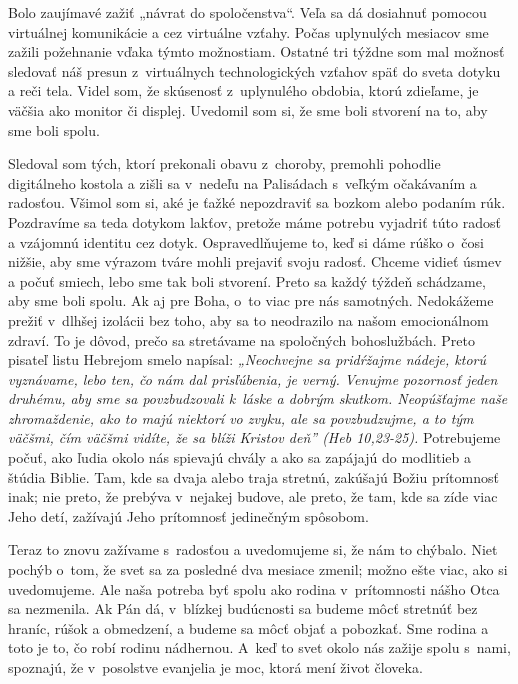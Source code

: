 


Bolo zaujímavé zažiť „návrat do spoločenstva“. Veľa sa dá dosiahnuť pomocou virtuálnej komunikácie a cez virtuálne vzťahy. Počas uplynulých mesiacov sme zažili požehnanie vďaka týmto možnostiam. Ostatné tri týždne som mal možnosť sledovať náš presun z~virtuálnych technologických vzťahov späť do sveta dotyku a reči tela. Videl som, že skúsenosť z~uplynulého obdobia, ktorú zdieľame, je väčšia ako monitor či displej. Uvedomil som si, že sme boli stvorení na to, aby sme boli spolu.

Sledoval som tých, ktorí prekonali obavu z~choroby, premohli pohodlie digitálneho kostola a zišli sa v~nedeľu na Palisádach s~veľkým očakávaním a radosťou. Všimol som si, aké je ťažké nepozdraviť sa bozkom alebo podaním rúk. Pozdravíme sa teda dotykom lakťov, pretože máme potrebu vyjadriť túto radosť a vzájomnú identitu cez dotyk. Ospravedlňujeme to, keď si dáme rúško o~čosi nižšie, aby sme výrazom tváre mohli prejaviť svoju radosť. Chceme vidieť úsmev a počuť smiech, lebo sme tak boli stvorení. Preto sa každý týždeň schádzame, aby sme boli spolu. Ak aj pre Boha, o~to viac pre nás samotných. Nedokážeme prežiť v~dlhšej izolácii bez toho, aby sa to neodrazilo na našom emocionálnom zdraví. To je dôvod, prečo sa stretávame na spoločných bohoslužbách. Preto pisateľ listu Hebrejom smelo napísal: {\it „Neochvejne sa pridŕžajme nádeje, ktorú vyznávame, lebo ten, čo nám dal prisľúbenia, je verný. Venujme pozornosť jeden druhému, aby sme sa povzbudzovali k~láske a dobrým skutkom.  Neopúšťajme naše zhromaždenie, ako to majú niektorí vo zvyku, ale sa povzbudzujme, a to tým väčšmi, čím väčšmi vidíte, že sa blíži Kristov deň” (Heb 10,23-25).} Potrebujeme počuť, ako ľudia okolo nás spievajú chvály a ako sa zapájajú do modlitieb a štúdia Biblie. Tam, kde sa dvaja alebo traja stretnú, zakúšajú Božiu prítomnosť inak; nie preto, že prebýva v~nejakej budove, ale preto, že tam, kde sa zíde viac Jeho detí, zažívajú Jeho prítomnosť jedinečným spôsobom.

Teraz to znovu zažívame s~radosťou a uvedomujeme si, že nám to chýbalo. Niet pochýb o~tom, že svet sa za posledné dva mesiace zmenil; možno ešte viac, ako si uvedomujeme. Ale naša potreba byť spolu ako rodina v~prítomnosti nášho Otca sa nezmenila. Ak Pán dá, v~blízkej budúcnosti sa budeme môcť stretnúť bez hraníc, rúšok a obmedzení, a budeme sa môcť objať a pobozkať. Sme rodina a toto je to, čo robí rodinu nádhernou. A~keď to svet okolo nás zažije spolu s~nami, spoznajú, že v~posolstve evanjelia je moc, ktorá mení život človeka.

